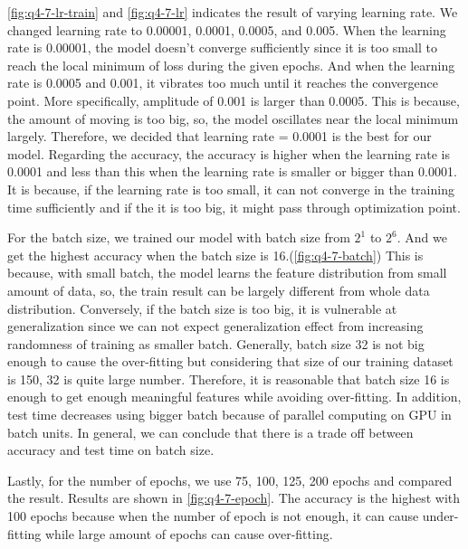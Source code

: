 \cref{fig:q4-7-lr-train} and \cref{fig:q4-7-lr} indicates the result of varying learning rate. We changed learning rate to 0.00001, 0.0001, 0.0005, and 0.005. When the learning rate is 0.00001, the model doesn't converge sufficiently since it is too small to reach the local minimum of loss during the given epochs. And when the learning rate is 0.0005 and 0.001, it vibrates too much until it reaches the convergence point. More specifically, amplitude of 0.001 is larger than 0.0005. This is because, the amount of moving is too big, so, the model oscillates near the local minimum largely. Therefore, we decided that learning rate = 0.0001 is the best for our model. Regarding the accuracy, the accuracy is higher when the learning rate is 0.0001 and less than this when the learning rate is smaller or bigger than 0.0001. It is because, if the learning rate is too small, it can not converge in the training time sufficiently and if the it is too big, it might pass through optimization point.

For the batch size, we trained our model with batch size from $2^1$ to $2^6$. And we get the highest accuracy when the batch size is 16.(\cref{fig:q4-7-batch}) This is because, with small batch, the model learns the feature distribution from small amount of data, so, the train result can be largely different from whole data distribution. Conversely, if the batch size is too big, it is vulnerable at generalization since we can not expect generalization effect from increasing randomness of training as smaller batch. Generally, batch size 32 is not big enough to cause the over-fitting but considering that size of our training dataset is 150, 32 is quite large number. Therefore, it is reasonable that batch size 16 is enough to get enough meaningful features while avoiding over-fitting. In addition, test time decreases using bigger batch because of parallel computing on GPU in batch units. In general, we can conclude that there is a trade off between accuracy and test time on batch size.

Lastly, for the number of epochs, we use 75, 100, 125, 200 epochs and compared the result. Results are shown in \cref{fig:q4-7-epoch}. The accuracy is the highest with 100 epochs because when the number of epoch is not enough, it can cause under-fitting while large amount of epochs can cause over-fitting.

